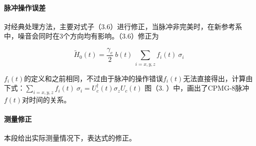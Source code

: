 \paragraph{脉冲操作误差}
对经典处理方法，主要对式子（3.6）进行修正，当脉冲非完美时，在新参考系中，噪音会同时在3个方向均有影响。（3.6）修正为

\begin{equation}
    \widetilde{H}_0(t)=\frac{\gamma_{e}}{2}\  b(t) \ \sum_{i=x,y,z} f_i(t)\  \sigma_i
\end{equation}

$f_i(t)$的定义和之前相同，不过由于脉冲的操作错误$f_i(t)$无法直接得出，计算由下式：$\sum_{i=x,y,z} f_i(t)\  \sigma_i=U_c^\dagger(t)\sigma_z U_c(t)$
图（3. ）中，画出了CPMG-8脉冲$f(t)$对时间的关系。
\paragraph{测量修正}
本段给出实际测量情况下，表达式的修正。
